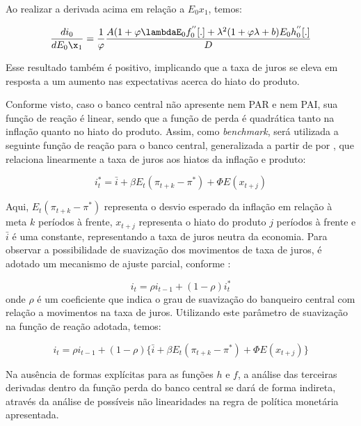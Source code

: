 \documentclass[
	article,			%
	11pt,				%
	oneside,			%
	a4paper,			%
	english,			%
	brazil,				%
	]{abntex2}
\begin{document}
	Ao realizar a derivada acima em relação a $E_0x_1$, temos:
	
	\begin{equation}
		\frac{di_0}{dE_0\x_1} = \frac{1}{\varphi} \frac{A(1+\varphi\lambdaE_0f_0^{''}[.] + \lambda^2(1 + \varphi\lambda + b)E_0h_0^{''}[.]}{D} 
	\end{equation}
	
	Esse resultado também é positivo, implicando que a taxa de juros se eleva em resposta a um aumento nas expectativas acerca do hiato do produto.
	
	Conforme visto, caso o banco central não apresente nem PAR e nem PAI, sua função de reação é linear, sendo que a função de perda é quadrática tanto na inflação quanto no hiato do produto. Assim, como \textit{benchmark}, será utilizada a seguinte função de reação para o banco central, generalizada a partir de  por , que relaciona linearmente a taxa de juros aos hiatos da inflação e produto:
	
	\begin{equation}
		i_t^* = \bar{i} + \beta E_t(\pi_{t+k} - \pi^*) + \Phi E(x_{t+j})
	\end{equation}
	
	Aqui, $E_t(\pi_{t+k} - \pi^*)$ representa o desvio esperado da inflação em relação à meta $k$ períodos à frente, $x_{t+j}$ representa o hiato do produto $j$ períodos à frente e $\bar{i}$ é uma constante, representando a taxa de juros neutra da economia. Para observar a possibilidade de suavização dos movimentos de taxa de juros, é adotado um mecanismo de ajuste parcial, conforme :
		
	\begin{equation}
		i_t = \rho i_{t-1} + (1-\rho) i_t^*
	\end{equation}
	onde $\rho$ é um coeficiente que indica o grau de suavização do banqueiro central com relação a movimentos na taxa de juros. Utilizando este parâmetro de suavização na função de reação adotada, temos:
	
	\begin{equation} \label{linear}
		i_t = \rho i_{t-1} + (1-\rho) \{ \bar{i} + \beta E_t(\pi_{t+k} - \pi^*) + \Phi E(x_{t+j}) \}
	\end{equation}
		
	 Na ausência de formas explícitas para as funções $h$ e $f$, a análise das terceiras derivadas dentro da função perda do banco central se dará de forma indireta, através da análise de possíveis não linearidades na regra de política monetária apresentada.  
	
\end{document}
